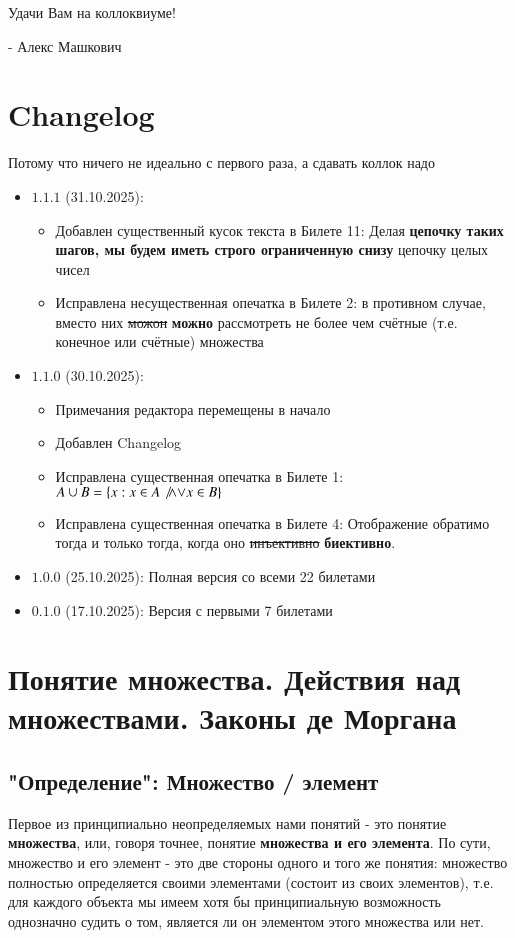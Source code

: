 \documentclass{article}
\begin{document}
Удачи Вам на коллоквиуме!

\hspace*{\fill} - Алекс Машкович


\newpage
\section*{Changelog}
Потому что ничего не идеально с первого раза, а сдавать коллок надо
\begin{itemize}
\item $\mathbf{1.1.1}$ (31.10.2025): \begin{itemize}
\item Добавлен существенный кусок текста в Билете 11: Делая \textbf{цепочку таких шагов, мы будем иметь строго ограниченную снизу} цепочку целых чисел
\item Исправлена несущественная опечатка в Билете 2: в противном случае, вместо них \sout{можон} \textbf{можно} рассмотреть не более чем счётные (т.е. конечное или счётные) множества
\end{itemize}
\item $\mathbf{1.1.0}$ (30.10.2025): \begin{itemize}
\item Примечания редактора перемещены в начало
\item Добавлен Changelog
\item Исправлена существенная опечатка в Билете 1: $A \cup B = \{x : x \in A \not\wedge \mathbf{\vee} x \in B \}$
\item Исправлена существенная опечатка в Билете 4: Отображение обратимо тогда и только тогда, когда оно \sout{инъективно} \textbf{биективно}.
\end{itemize}
\item $\mathbf{1.0.0}$ (25.10.2025): Полная версия со всеми 22 билетами
\item $\mathbf{0.1.0}$ (17.10.2025): Версия с первыми 7 билетами
\end{itemize}

\newpage
\section{Понятие множества. Действия над множествами. Законы де Моргана}
\subsection{"Определение": Множество / элемент}
Первое из принципиально неопределяемых нами понятий - это понятие \textbf{множества}, или, говоря точнее, понятие \textbf{множества и его элемента}. По сути, множество и его элемент - это две стороны одного и того же понятия: множество полностью определяется своими элементами (состоит из своих элементов), т.е. для каждого объекта мы имеем хотя бы принципиальную возможность однозначно судить о том, является ли он элементом этого множества или нет.
\end{document}
